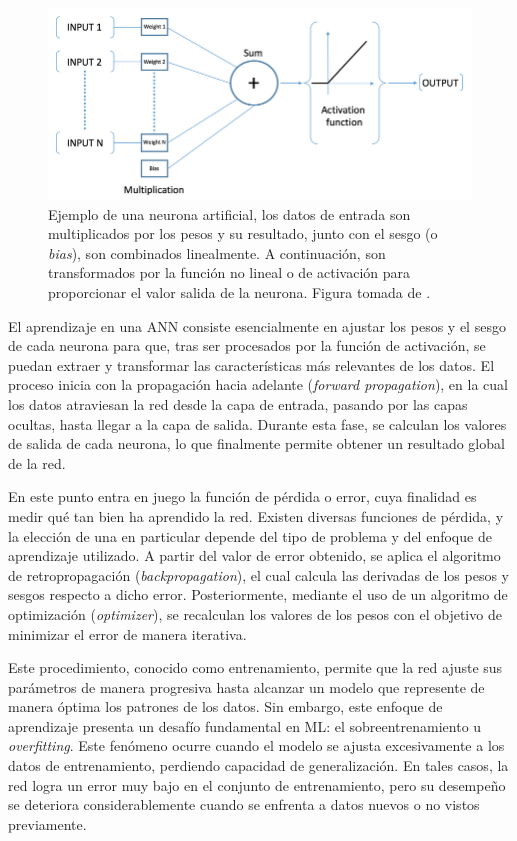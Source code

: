 \begin{figure}[h]
    \centering
    \includegraphics[width=\linewidth]{figures/2_theory/artificialNeuron.png}
    \caption[Ejemplo de una neurona artificial]{Ejemplo de una neurona artificial, los datos de entrada son multiplicados por los pesos y su resultado, junto con el sesgo (o \textit{bias}), son combinados linealmente. A continuación, son transformados por la función no lineal o de activación para proporcionar el valor salida de la neurona. Figura tomada de \cite{artificialNeuron}.}
    \label{fig:artificialNeuronExample}
\end{figure}

El aprendizaje en una ANN consiste esencialmente en ajustar los pesos y el sesgo de cada neurona para que, tras ser procesados por la función de activación, se puedan extraer y transformar las características más relevantes de los datos. El proceso inicia con la propagación hacia adelante (\textit{forward propagation}), en la cual los datos atraviesan la red desde la capa de entrada, pasando por las capas ocultas, hasta llegar a la capa de salida. Durante esta fase, se calculan los valores de salida de cada neurona, lo que finalmente permite obtener un resultado global de la red.

En este punto entra en juego la función de pérdida o error, cuya finalidad es medir qué tan bien ha aprendido la red. Existen diversas funciones de pérdida, y la elección de una en particular depende del tipo de problema y del enfoque de aprendizaje utilizado. A partir del valor de error obtenido, se aplica el algoritmo de retropropagación (\textit{backpropagation}), el cual calcula las derivadas de los pesos y sesgos respecto a dicho error. Posteriormente, mediante el uso de un algoritmo de optimización (\textit{optimizer}), se recalculan los valores de los pesos con el objetivo de minimizar el error de manera iterativa.

Este procedimiento, conocido como entrenamiento, permite que la red ajuste sus parámetros de manera progresiva hasta alcanzar un modelo que represente de manera óptima los patrones de los datos. Sin embargo, este enfoque de aprendizaje presenta un desafío fundamental en ML: el sobreentrenamiento u \textit{overfitting}. Este fenómeno ocurre cuando el modelo se ajusta excesivamente a los datos de entrenamiento, perdiendo capacidad de generalización. En tales casos, la red logra un error muy bajo en el conjunto de entrenamiento, pero su desempeño se deteriora considerablemente cuando se enfrenta a datos nuevos o no vistos previamente.

